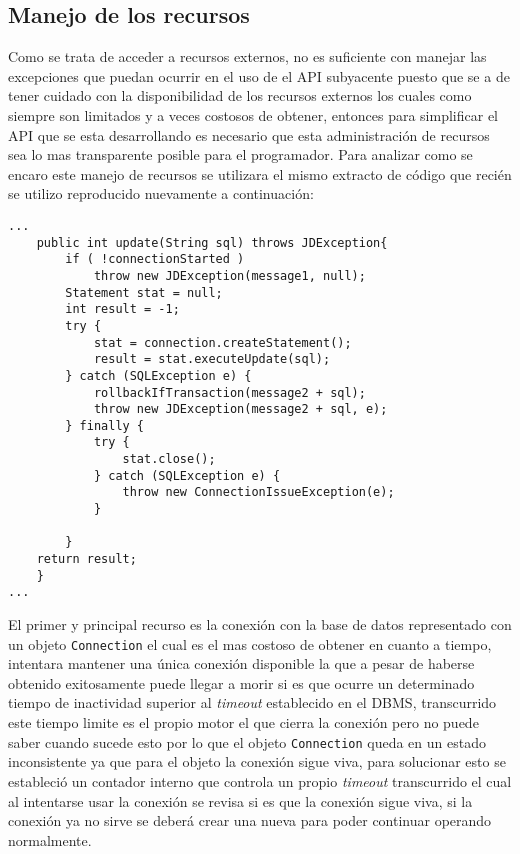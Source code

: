 \subsection{Manejo de los recursos}
Como \jd se trata de acceder a recursos externos, no es suficiente con manejar las excepciones que puedan ocurrir en el uso de el API subyacente puesto que se a de tener cuidado con la disponibilidad de los recursos externos los cuales como siempre son limitados y a veces costosos de obtener, entonces para simplificar el API que se esta desarrollando es necesario que esta administración de recursos sea lo mas transparente posible para el programador. Para analizar como se encaro este manejo de recursos se utilizara el mismo extracto de código que recién se utilizo reproducido nuevamente a continuación:
%
\begin{lstlisting}[title=función extraída de JDBCManager]
...
	public int update(String sql) throws JDException{
		if ( !connectionStarted ) 
			throw new JDException(message1, null);
		Statement stat = null;
		int result = -1;
		try {
			stat = connection.createStatement();
			result = stat.executeUpdate(sql);
		} catch (SQLException e) {
			rollbackIfTransaction(message2 + sql);
			throw new JDException(message2 + sql, e);
		} finally {
			try {
				stat.close();
			} catch (SQLException e) {
				throw new ConnectionIssueException(e);
			}
			
		}
	return result; 
	}
...
\end{lstlisting}
%
El primer y principal recurso es la conexión con la base de datos representado con un objeto \verb=Connection= el cual es el mas costoso de obtener en cuanto a tiempo, \jd intentara mantener una única conexión disponible la que a pesar de haberse obtenido exitosamente puede llegar a morir si es que ocurre un determinado tiempo de inactividad superior al \textit{timeout} establecido en el DBMS, transcurrido este tiempo limite es el propio motor el que cierra la conexión pero \jd no puede saber cuando sucede esto por lo que el objeto \verb=Connection= queda en un estado inconsistente ya que para el objeto la conexión sigue viva, para solucionar esto se estableció un contador interno que controla un propio \textit{timeout} transcurrido el cual al intentarse usar la conexión se revisa si es que la conexión sigue viva, si la conexión ya no sirve se deberá crear una nueva para poder continuar operando normalmente.

